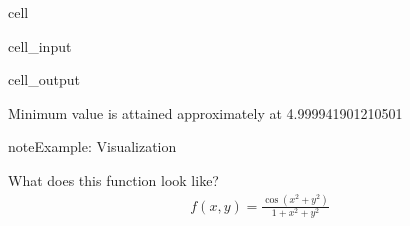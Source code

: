\documentclass[letterpaper,10pt,english]{jupyterBook}
\begin{document}
\begin{sphinxuseclass}{cell}\begin{sphinxVerbatimInput}

\begin{sphinxuseclass}{cell_input}
\begin{sphinxVerbatim}[commandchars=\\\{\}]
   
   
        
      
 
\end{sphinxVerbatim}

\end{sphinxuseclass}\end{sphinxVerbatimInput}
\begin{sphinxVerbatimOutput}

\begin{sphinxuseclass}{cell_output}
\begin{sphinxVerbatim}[commandchars=\\\{\}]
Minimum value is attained approximately at 4.999941901210501
\end{sphinxVerbatim}

\end{sphinxuseclass}\end{sphinxVerbatimOutput}

\end{sphinxuseclass}
\begin{sphinxadmonition}{note}{Example: Visualization}

\sphinxAtStartPar
What does this function look like?
\begin{equation*}
\begin{split}
f(x, y) = \frac{\cos(x^2 + y^2)}{1 + x^2 + y^2}
\end{split}
\end{equation*}\end{sphinxadmonition}
\end{document}
